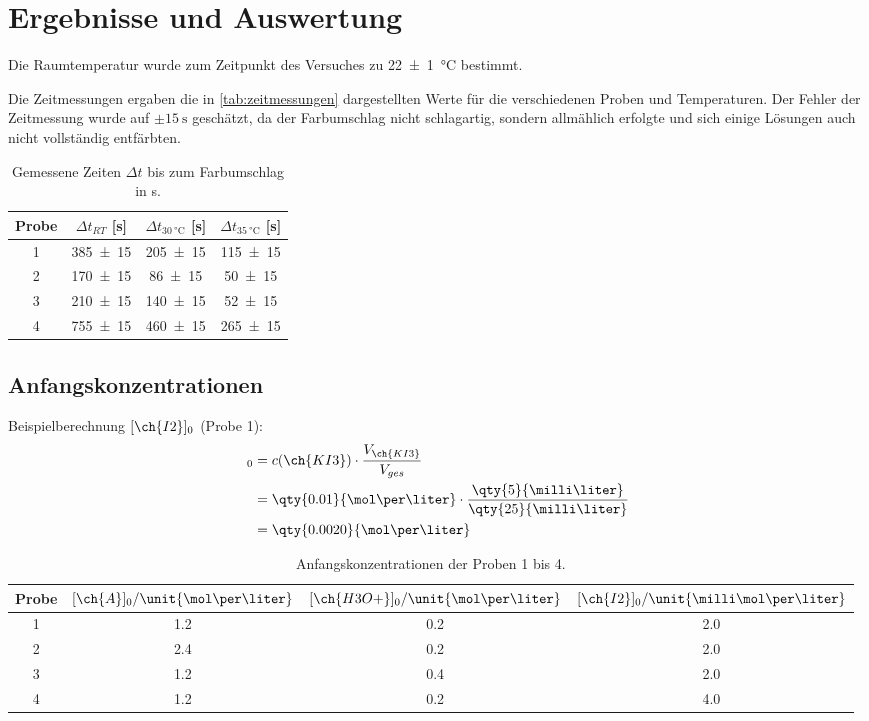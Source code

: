 \section{Ergebnisse und Auswertung}
Die Raumtemperatur wurde zum Zeitpunkt des Versuches zu \qty{22 +- 1}{\degreeCelsius} bestimmt.

Die Zeitmessungen ergaben die in \autoref{tab:zeitmessungen} dargestellten Werte für die verschiedenen Proben und Temperaturen.
Der Fehler der Zeitmessung wurde auf $\pm \qty{15}{\second}$ geschätzt, da der Farbumschlag nicht schlagartig, sondern allmählich erfolgte und sich einige Lösungen auch nicht vollständig entfärbten.
\begin{table}[H]
    \centering
    \caption{Gemessene Zeiten $\Delta t$ bis zum Farbumschlag in \unit{\second}.}
    \label{tab:zeitmessungen}
    \begin{tabular}{c c c c}
        \toprule
        Probe & $\Delta t_{RT}$ [\unit{\second}] & $\Delta t_{\qty{30}{\degreeCelsius}}$ [\unit{\second}] & $\Delta t_{\qty{35}{\degreeCelsius}}$ [\unit{\second}] \\ \midrule
        1 & \num{385 +- 15} & \num{205 +- 15} & \num{115 +- 15} \\ \midrule
        2 & \num{170 +- 15} &  \num{86 +- 15} &  \num{50 +- 15} \\ \midrule
        3 & \num{210 +- 15} & \num{140 +- 15} &  \num{52 +- 15} \\ \midrule
        4 & \num{755 +- 15} & \num{460 +- 15} & \num{265 +- 15} \\
        \bottomrule
    \end{tabular}
\end{table}

\subsection{Anfangskonzentrationen}
Beispielberechnung $[\ch{I2}]_0$ (Probe 1):
\begin{align*}
   [\ch{I2}]_0 &= c({\ch{KI3}}) \cdot \frac{V_{\ch{KI3}}}{V_{ges}} \\
               &= \qty{0.01}{\mol\per\liter} \cdot \frac{\qty{5}{\milli\liter}}{\qty{25}{\milli\liter}} \\
               &= \qty{0.0020}{\mol\per\liter}
\end{align*}
\begin{table}[H]
    \centering
    \caption{Anfangskonzentrationen der Proben 1 bis 4.}
    \label{tab:anfangskonzentrationen}
    \begin{tabular}{c c c c}
        \toprule
        Probe & $[\ch{A}]_0 / \unit{\mol\per\liter}$ & $[\ch{H3O+}]_0 / \unit{\mol\per\liter}$ & $[\ch{I2}]_0 / \unit{\milli\mol\per\liter}$ \\ \midrule
        1 & 1.2 & 0.2 & 2.0 \\ \midrule
        2 & 2.4 & 0.2 & 2.0 \\ \midrule
        3 & 1.2 & 0.4 & 2.0 \\ \midrule
        4 & 1.2 & 0.2 & 4.0 \\
        \bottomrule
    \end{tabular}
\end{table}

